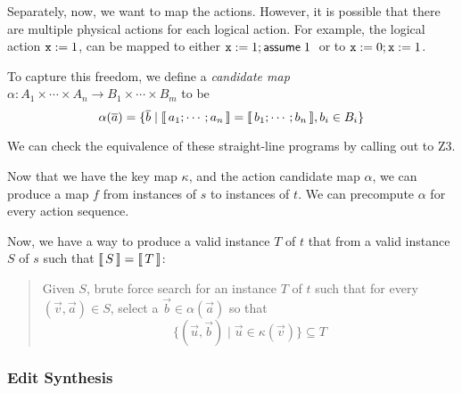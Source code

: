 
Separately, now, we want to map the actions. However, it is possible
that there are multiple physical actions for each logical action. For
example, the logical action $\texttt{x}:=1$, can be mapped to either
$\texttt{x} := 1; \mathsf{assume}\; 1\;$ or to $\texttt{x}:= 0; \texttt{x}:= 1$.

To capture this freedom, we define a \emph{candidate map}
$\alpha : A_1 \times \cdots \times A_n \to B_1 \times \cdots \times
B_m$ to be
\[\alpha(\overline{a}) = \{\overline{b} \mid \llbracket\,a_1;\cdots;a_n\,\rrbracket =
  \llbracket\,b_1; \cdots; b_n\,\rrbracket, b_i \in B_i  \}\]

We can check the equivalence of these straight-line programs by
calling out to Z3.     

Now that we have the key map $\kappa$, and the action candidate map
$\alpha$, we can produce a map $f$ from instances of $s$ to instances
of $t$. We can precompute $\alpha$ for every action sequence.

Now, we have a way to produce a valid instance $T$ of $t$ that from a
valid instance $S$ of $s$ such that $\llbracket\,S\,\rrbracket = \llbracket\,T\,\rrbracket$:
\begin{quote}
  Given $S$, brute force search for an instance $T$ of $t$ such that
  for every $(\vec v, \vec a) \in S$, select a
  $\vec b \in \alpha(\vec a)$ so that
  \[\{(\vec u, \vec b) \mid \vec u \in
    \kappa(\vec v)\} \subseteq T\]
\end{quote}


\subsubsection{Edit Synthesis}


